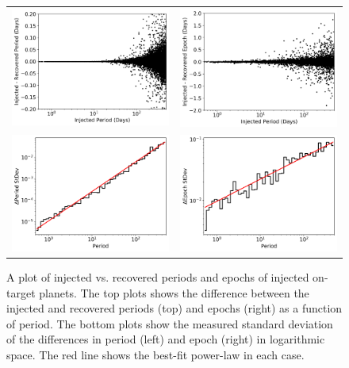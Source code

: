 \begin{figure}[ht]
\centering
\begin{tabular}{cc}
\includegraphics[width=0.5\linewidth]{INJ1-Ephem-Recovery-1.png} &
\includegraphics[width=0.5\linewidth]{INJ1-Ephem-Recovery-2.png} \\
\includegraphics[width=0.5\linewidth]{INJ1-Ephem-Recovery-3.png} &
\includegraphics[width=0.5\linewidth]{INJ1-Ephem-Recovery-4.png}
\end{tabular}
\caption{A plot of injected vs. recovered periods and epochs of injected on-target planets. The top plots shows the difference between the injected and recovered periods (top) and epochs (right) as a function of period. The bottom plots show the measured standard deviation of the differences in period (left) and epoch (right) in logarithmic space. The red line shows the best-fit power-law in each case.}
\label{injephemfig}
\end{figure}


